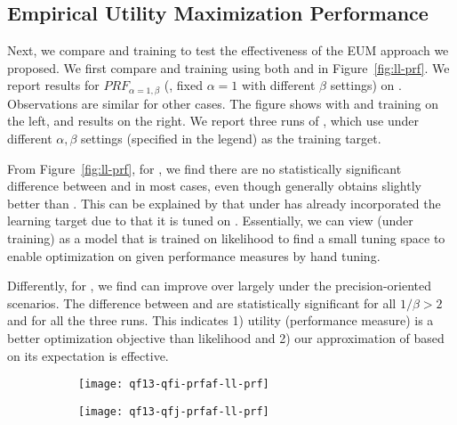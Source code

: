 \subsection{Empirical Utility Maximization Performance}
Next, we compare \EUM  and \MLE training to test the effectiveness of the EUM approach we proposed. We first compare \EUM and \MLE training using both \QFI and \QFJ in Figure~\ref{fig:ll-prf}. We report results for $P\!R\!F_{\alpha=1,\beta}$ (\ie, fixed $\alpha=1$ with different $\beta$ settings) on \DQF. Observations are similar for other cases. The figure shows \QFI with \EUM and \MLE training on the left, and \QFJ results on the right. We report three runs of \EUM, which use \PRF under different $\alpha,\beta$  settings (specified in the legend) as the training target.

From Figure~\ref{fig:ll-prf}, for \QFI, we find there are no statistically significant difference between \MLE and \EUM in most cases, even though generally \EUM obtains slightly better \PRF than \MLE. This can be explained by that \QFI under \MLE has already incorporated the \PRF learning target due to that it is tuned on \PRF. Essentially, we can view \QFI (under \MLE training) as a model that is trained on likelihood to find a small tuning space to enable optimization on given performance measures by hand tuning.

Differently, for \QFI, we find \EUM can improve over \MLE largely under the precision-oriented scenarios. The difference between \EUM and \MLE are statistically significant for all $1/\beta>2$ and for all the three \EUM runs. This indicates 1) utility (performance measure) is a better optimization objective than likelihood and 2) our approximation of \PRF based on its expectation is effective. 

\begin{figure}[ht!]
\centering
\caption{$P\!R\!F_{\alpha=1,\beta}$ performance for \MLE and \EUM training using \QFI (left) and \QFJ (right) on \DQF. The three \EUM runs use \PRF under different $\alpha,\beta$ settings (specified in the legend) as the training target.}
\label{fig:ll-prf}
\begin{subfigure}[b]{0.45\columnwidth}
\texttt{[image: qf13-qfi-prfaf-ll-prf]}
\caption{\QFI}
\end{subfigure}
\begin{subfigure}[b]{0.45\columnwidth}
\texttt{[image: qf13-qfj-prfaf-ll-prf]}
\caption{\QFJ}
\end{subfigure}
\end{figure}

